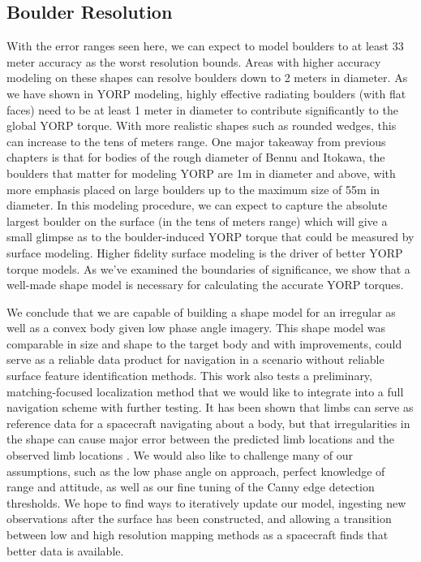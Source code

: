\subsection{Boulder Resolution}
With the error ranges seen here, we can expect to model boulders to at least 33 meter accuracy as the worst resolution bounds. Areas with higher accuracy modeling on these shapes can resolve boulders down to 2 meters in diameter. As we have shown in YORP modeling, highly effective radiating boulders (with flat faces) need to be at least 1 meter in diameter to contribute significantly to the global YORP torque. With more realistic shapes such as rounded wedges, this can increase to the tens of meters range.
One major takeaway from previous chapters is that for bodies of the rough diameter of Bennu and Itokawa, the boulders that matter for modeling YORP are 1m in diameter and above, with more emphasis placed on large boulders up to the maximum size of 55m in diameter. In this modeling procedure, we can expect to capture the absolute largest boulder on the surface (in the tens of meters range) which will give a small glimpse as to the boulder-induced YORP torque that could be measured by surface modeling. Higher fidelity surface modeling is the driver of better YORP torque models. As we've examined the boundaries of significance, we show that a well-made shape model is necessary for calculating the accurate YORP torques.

We conclude that we are capable of building a shape model for an irregular as well as a convex body given low phase angle imagery. This shape model was comparable in size and shape to the target body and with improvements, could serve as a reliable data product for navigation in a scenario without reliable surface feature identification methods. This work also tests a preliminary, matching-focused localization method that we would like to integrate into a full navigation scheme with further testing. It has been shown that limbs can serve as reference data for a spacecraft navigating about a body, but that irregularities in the shape can cause major error between the predicted limb locations and the observed limb locations \citep{Liounis}. We would also like to challenge many of our assumptions, such as the low phase angle on approach, perfect knowledge of range and attitude, as well as our fine tuning of the Canny edge detection thresholds. We hope to find ways to iteratively update our model, ingesting new observations after the surface has been constructed, and allowing a transition between low and high resolution mapping methods as a spacecraft finds that better data is available.


